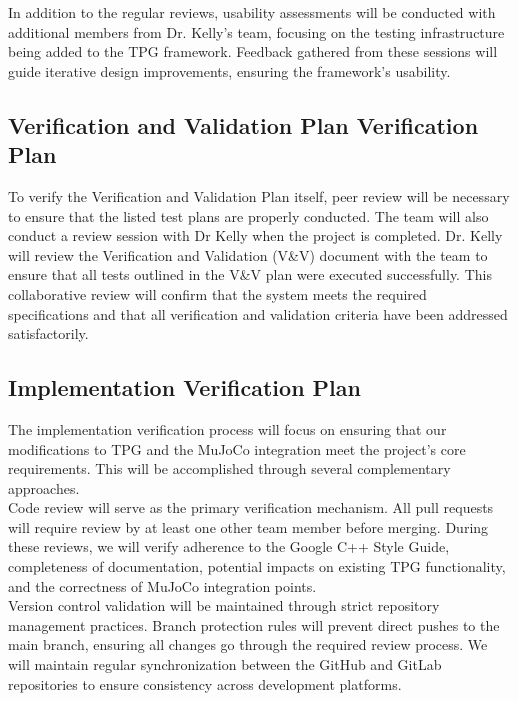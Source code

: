 \documentclass[12pt, titlepage]{article}
\begin{document}
In addition to the regular reviews, usability assessments will be conducted with additional members from Dr. Kelly's team, focusing on the testing infrastructure being added to the TPG framework. Feedback gathered from these sessions will guide iterative design improvements, ensuring the framework's usability.


\subsection{Verification and Validation Plan Verification Plan}

To verify the Verification and Validation Plan itself, peer review will be necessary to ensure that the listed test plans are properly conducted. The team will also conduct a review session with Dr Kelly when the project is completed. Dr. Kelly will review the Verification and Validation (V\&V) document with the team to ensure that all tests outlined in the V\&V plan were executed successfully. This collaborative review will confirm that the system meets the required specifications and that all verification and validation criteria have been addressed satisfactorily.

\subsection{Implementation Verification Plan}

The implementation verification process will focus on ensuring that our modifications to TPG and the MuJoCo integration meet the project's core requirements. This will be accomplished through several complementary approaches. \\

Code review will serve as the primary verification mechanism. All pull requests will require review by at least one other team member before merging. During these reviews, we will verify adherence to the Google C++ Style Guide, completeness of documentation, potential impacts on existing TPG functionality, and the correctness of MuJoCo integration points. \\

Version control validation will be maintained through strict repository management practices. Branch protection rules will prevent direct pushes to the main branch, ensuring all changes go through the required review process. We will maintain regular synchronization between the GitHub and GitLab repositories to ensure consistency across development platforms. \\
\end{document}
